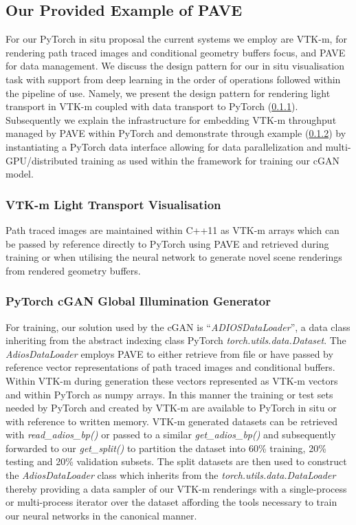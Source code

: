 \subsection{Our Provided Example of PAVE}\label{ex}

For our PyTorch in situ proposal the current systems we employ are VTK-m, for rendering path traced images and conditional geometry buffers focus, and PAVE for data management. We discuss the design pattern for our in situ visualisation task with support from deep learning in the order of operations followed within the pipeline of use. Namely, we present the design pattern for rendering light transport in VTK-m coupled with data transport to PyTorch (\ref{pathtracer}). Subsequently we explain the infrastructure for embedding VTK-m throughput managed by PAVE within PyTorch and demonstrate through example (\ref{pytorch}) by  instantiating a PyTorch data interface allowing for data parallelization and multi-GPU/distributed training as used within the framework for training our cGAN model.

\subsubsection{VTK-m Light Transport Visualisation}\label{pathtracer}

Path traced images are maintained within C++11 as VTK-m arrays which can be passed by reference directly to PyTorch using PAVE and retrieved during training or when utilising the neural network to generate novel scene renderings from rendered geometry buffers. 

\subsubsection{PyTorch cGAN Global Illumination Generator}\label{pytorch}

For training, our solution used by the cGAN is ``{\it ADIOSDataLoader}'', a data class inheriting from the abstract indexing class PyTorch {\it torch.utils.data.Dataset}. The {\it AdiosDataLoader} employs PAVE to either retrieve from file or have passed by reference vector representations of path traced images and conditional buffers. Within VTK-m during generation these vectors represented as VTK-m vectors and within PyTorch as numpy arrays. In this manner the training or test sets needed by PyTorch and created by VTK-m are available to PyTorch in situ or with reference to written memory. VTK-m generated datasets can be retrieved with {\it read\_adios\_bp()} or passed to a similar {\it get\_adios\_bp()} and subsequently forwarded to our {\it get\_split()}  to partition the dataset into 60\% training, 20\% testing and 20\% validation subsets. The split datasets are then used to construct the {\it AdiosDataLoader} class which inherits from the {\it torch.utils.data.DataLoader} thereby providing a data sampler of our VTK-m renderings with a single-process or multi-process iterator over the dataset affording the tools necessary to train our neural networks in the canonical manner.

